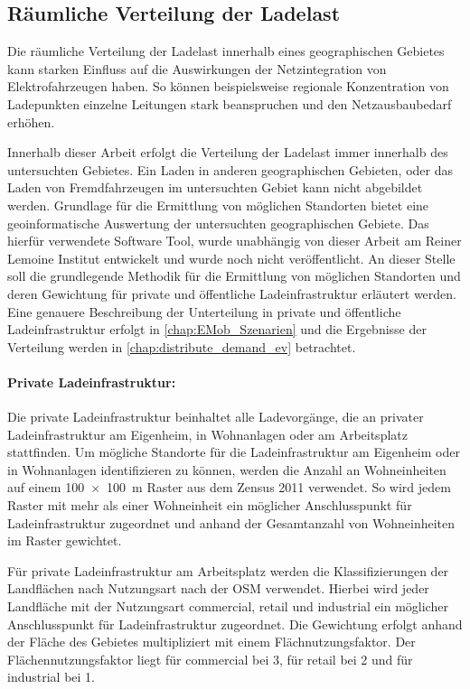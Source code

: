 \subsection{Räumliche Verteilung der Ladelast}

Die räumliche Verteilung der Ladelast innerhalb eines geographischen Gebietes kann starken Einfluss auf die Auswirkungen der Netzintegration von Elektrofahrzeugen haben.
So können beispielsweise regionale Konzentration von Ladepunkten einzelne Leitungen stark beanspruchen und den Netzausbaubedarf erhöhen.\medskip

Innerhalb dieser Arbeit erfolgt die Verteilung der Ladelast immer innerhalb des untersuchten Gebietes.
Ein Laden in anderen geographischen Gebieten, oder das Laden von \glqq Fremdfahrzeugen\grqq{} im untersuchten Gebiet kann nicht abgebildet werden.
Grundlage für die Ermittlung von möglichen Standorten bietet eine geoinformatische Auswertung der untersuchten geographischen Gebiete.
Das hierfür verwendete Software Tool, wurde unabhängig von dieser Arbeit am Reiner Lemoine Institut entwickelt und wurde noch nicht veröffentlicht.
An dieser Stelle soll die grundlegende Methodik für die Ermittlung von möglichen Standorten und deren Gewichtung für private und öffentliche Ladeinfrastruktur erläutert werden.
Eine genauere Beschreibung der Unterteilung in private und öffentliche Ladeinfrastruktur erfolgt in \autoref{chap:EMob_Szenarien} und die Ergebnisse der Verteilung werden in \autoref{chap:distribute_demand_ev} betrachtet.


\paragraph{Private Ladeinfrastruktur:}

Die private Ladeinfrastruktur beinhaltet alle Ladevorgänge, die an privater Ladeinfrastruktur am Eigenheim, in Wohnanlagen oder am Arbeitsplatz stattfinden.
Um mögliche Standorte für die Ladeinfrastruktur am Eigenheim oder in Wohnanlagen identifizieren zu können, werden die Anzahl an Wohneinheiten auf einem \SI{100 x 100}{\m} Raster aus dem Zensus 2011 \cite{StatistischesBundesamt2011} verwendet.
So wird jedem Raster mit mehr als einer Wohneinheit ein möglicher Anschlusspunkt für Ladeinfrastruktur zugeordnet und anhand der Gesamtanzahl von Wohneinheiten im Raster gewichtet.\medskip

Für private Ladeinfrastruktur am Arbeitsplatz werden die Klassifizierungen der Landflächen nach Nutzungsart nach der \gls{OSM} \cite{OpenStreetMapFoundation} verwendet.
Hierbei wird jeder Landfläche mit der Nutzungsart \glqq commercial\grqq , \glqq retail\grqq{} und \glqq industrial\grqq{} ein möglicher Anschlusspunkt für Ladeinfrastruktur zugeordnet.
Die Gewichtung erfolgt anhand der Fläche des Gebietes multipliziert mit einem Flächnutzungsfaktor.
Der Flächennutzungsfaktor liegt für \glqq commercial\grqq{} bei \num{3}, für \glqq retail\grqq{} bei \num{2} und für \glqq industrial\grqq{} bei \num{1}.


